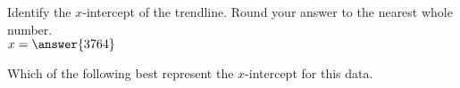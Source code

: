 \documentclass{ximera}
\begin{document}
\begin{exercise}
Identify the $x$-intercept of the trendline. Round your answer to the nearest whole number.\\
$x=\answer{3764}$\calcHW
\end{exercise}
\begin{exercise}
Which of the following best represent the $x$-intercept for this data.
\begin{multipleChoice}
\end{multipleChoice}
\end{exercise}
\end{document}

